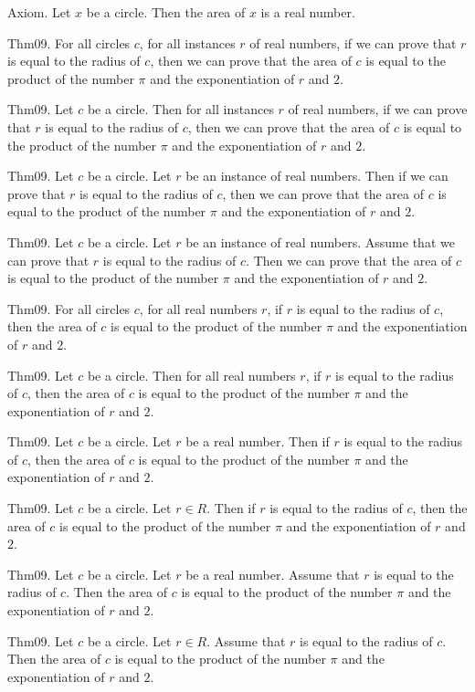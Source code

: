 \documentclass{article}
\begin{document}
Axiom. Let $x$ be a circle. Then the area of $x$ is a real number.

Thm09. For all circles $c$, for all instances $r$ of real numbers, if we can prove that $r$ is equal to the radius of $c$, then we can prove that the area of $c$ is equal to the product of the number \(\pi\) and the exponentiation of $r$ and $2$.

Thm09. Let $c$ be a circle. Then for all instances $r$ of real numbers, if we can prove that $r$ is equal to the radius of $c$, then we can prove that the area of $c$ is equal to the product of the number \(\pi\) and the exponentiation of $r$ and $2$.

Thm09. Let $c$ be a circle. Let $r$ be an instance of real numbers. Then if we can prove that $r$ is equal to the radius of $c$, then we can prove that the area of $c$ is equal to the product of the number \(\pi\) and the exponentiation of $r$ and $2$.

Thm09. Let $c$ be a circle. Let $r$ be an instance of real numbers. Assume that we can prove that $r$ is equal to the radius of $c$. Then we can prove that the area of $c$ is equal to the product of the number \(\pi\) and the exponentiation of $r$ and $2$.

Thm09. For all circles $c$, for all real numbers $r$, if $r$ is equal to the radius of $c$, then the area of $c$ is equal to the product of the number \(\pi\) and the exponentiation of $r$ and $2$.

Thm09. Let $c$ be a circle. Then for all real numbers $r$, if $r$ is equal to the radius of $c$, then the area of $c$ is equal to the product of the number \(\pi\) and the exponentiation of $r$ and $2$.

Thm09. Let $c$ be a circle. Let $r$ be a real number. Then if $r$ is equal to the radius of $c$, then the area of $c$ is equal to the product of the number \(\pi\) and the exponentiation of $r$ and $2$.

Thm09. Let $c$ be a circle. Let $r \in R$. Then if $r$ is equal to the radius of $c$, then the area of $c$ is equal to the product of the number \(\pi\) and the exponentiation of $r$ and $2$.

Thm09. Let $c$ be a circle. Let $r$ be a real number. Assume that $r$ is equal to the radius of $c$. Then the area of $c$ is equal to the product of the number \(\pi\) and the exponentiation of $r$ and $2$.

Thm09. Let $c$ be a circle. Let $r \in R$. Assume that $r$ is equal to the radius of $c$. Then the area of $c$ is equal to the product of the number \(\pi\) and the exponentiation of $r$ and $2$.
\end{document}
